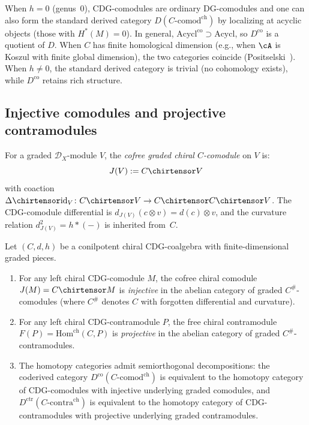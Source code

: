 \begin{remark}
\label{rem:exotic-vs-ordinary}
When $h = 0$ (genus~$0$), CDG-comodules are ordinary DG-comodules
and one can also form the standard derived category
$D(C\text{-}\mathrm{comod}^{\mathrm{ch}})$
by localizing at acyclic objects (those with $H^*(M) = 0$).  In general,
$\mathrm{Acycl}^{\mathrm{co}} \supset \mathrm{Acycl}$,
so $D^{\mathrm{co}}$ is a quotient of $D$.  When $C$ has
finite homological dimension (e.g., when $\cA$ is Koszul with finite
global dimension), the two categories coincide
(Positselski~\cite[\S4.5]{Positselski11}).  When $h \neq 0$, the standard
derived category is trivial (no cohomology exists), while
$D^{\mathrm{co}}$ retains rich structure.
\end{remark}

\subsection{Injective comodules and projective contramodules}
\label{subsec:chiral-inj-proj}

\begin{definition}
\label{def:cofree-chiral-comod}
For a graded $\mathcal{D}_X$-module $V$, the \emph{cofree graded
chiral $C$-comodule} on $V$ is:
\[
J(V) := C \chirtensor V
\]
with coaction $\Delta \chirtensor \mathrm{id}_V\colon
C \chirtensor V \to C \chirtensor C \chirtensor V$.
The CDG-comodule differential is
$d_{J(V)}(c \otimes v) = d(c) \otimes v$,
and the curvature relation $d_{J(V)}^2 = h \ast (-)$ is inherited
from~$C$.
\end{definition}

\begin{proposition}\label{prop:chiral-inj-proj-resolutions}
Let $(C, d, h)$ be a conilpotent chiral CDG-coalgebra with
finite-dimensional graded pieces.
\begin{enumerate}[label=\textup{(\alph*)}]
\item For any left chiral CDG-comodule $M$, the cofree chiral
  comodule $J(M) = C \chirtensor M$ is \emph{injective} in the
  abelian category of graded $C^{\#}$-comodules (where $C^{\#}$
  denotes $C$ with forgotten differential and curvature).
\item For any left chiral CDG-contramodule $P$, the free chiral
  contramodule $F(P) = \mathrm{Hom}^{\mathrm{ch}}(C, P)$ is
  \emph{projective} in the abelian category of graded
  $C^{\#}$-contramodules.
\item The homotopy categories admit semiorthogonal decompositions:
  the coderived category $D^{\mathrm{co}}(C\text{-}\mathrm{comod}^{\mathrm{ch}})$
  is equivalent to the homotopy category of CDG-comodules
  with injective underlying graded comodules, and
  $D^{\mathrm{ctr}}(C\text{-}\mathrm{contra}^{\mathrm{ch}})$
  is equivalent to the homotopy category of CDG-contramodules
  with projective underlying graded contramodules.
\end{enumerate}
\end{proposition}

